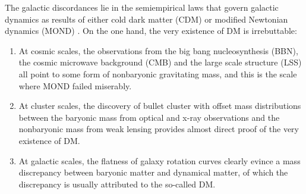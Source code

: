 \documentclass[aps,prd,twocolumn,10pt,groupedaddress]{revtex4-1}
\begin{document}
The galactic discordances lie in the semiempirical laws that govern galactic dynamics as results of either cold dark matter (CDM) or modified Newtonian dynamics (MOND) \cite{Milgrom:1983ca,Milgrom:1983pn,Milgrom:1983zz}. On the one hand, the very existence of DM is irrebuttable:
\begin{enumerate}
  \item At cosmic scales, the observations from the big bang nucleosynthesis (BBN), the cosmic microwave background (CMB) and the large scale structure (LSS) all point to some form of nonbaryonic gravitating mass, and this is the scale where MOND failed miserably.
  \item At cluster scales, the discovery of bullet cluster with offset mass distributions between the baryonic mass from optical and x-ray observations and the nonbaryonic mass from weak lensing provides almost direct proof \cite{Clowe:2006eq} of the very existence of DM.
  \item At galactic scales, the flatness of galaxy rotation curves clearly evince a mass discrepancy between baryonic matter and dynamical matter, of which the discrepancy is usually attributed  to the so-called DM.
\end{enumerate}
\end{document}
